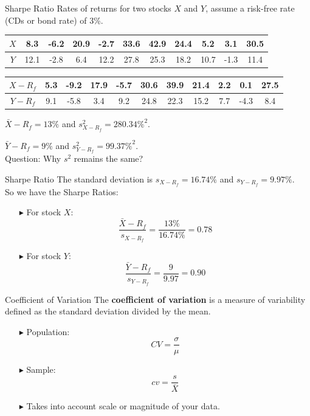 \documentclass[12pt]{beamer}
\begin{document}
\begin{frame}{Sharpe Ratio}
	Rates of returns for two stocks $X$ and $Y$, assume a risk-free rate (CDs or bond rate) of 3\%.
	
	\begin{center}
		\begin{tabular}{|c|c|c|c|c|c|c|c|c|c|c|}
			\hline
			$X$ & 8.3 &-6.2&20.9 &-2.7 &33.6&42.9&24.4&5.2&3.1&30.5\\
			\hline
			$Y$ & 12.1 &-2.8& 6.4& 12.2&27.8&25.3&18.2&10.7&-1.3&11.4\\
			\hline
		\end{tabular}
\end{center}
\begin{center}
		\begin{tabular}{|c|c|c|c|c|c|c|c|c|c|c|}
			\hline
			$X-R_f$ & 5.3 &-9.2&17.9 &-5.7 &30.6&39.9&21.4&2.2&0.1&27.5\\
			\hline
			$Y-R_f$ & 9.1 &-5.8& 3.4& 9.2&24.8&22.3&15.2&7.7&-4.3&8.4\\
			\hline
		\end{tabular}
	\end{center}
	$\bar{X}-R_f=13\%$ and $s_{X-R_f}^2=280.34\%^2$.
	
	$\bar{Y}-R_f=9\%$ and $s_{Y-R_f}^2=99.37\%^2$.\medskip\\
	
	Question: Why $s^2$ remains the same?
\end{frame}
\begin{frame}{Sharpe Ratio}
The standard deviation is
	$s_{X-R_f}=16.74\%$ and $s_{Y-R_f}=9.97\%$.\medskip\\
	
So we have the Sharpe Ratios:
\begin{itemize}
	\item[$\blacktriangleright$] For stock $X$:
	$$\frac{\bar{X}-R_f}{s_{X-R_f}}=\frac{13\%}{16.74\%}=0.78$$
	\item[$\blacktriangleright$] For stock $Y$:
	$$\frac{\bar{Y}-R_f}{s_{Y-R_f}}=\frac{9}{9.97}=0.90$$
\end{itemize}
\end{frame}
\begin{frame}{Coefficient of Variation}
The {\bf coefficient of variation} is a measure of variability defined as the standard deviation divided by the mean.
	\begin{itemize}
		\item[$\blacktriangleright$] Population:
		$$CV=\frac{\sigma}{\mu}$$
		\item[$\blacktriangleright$] Sample:
		$$cv=\frac{s}{\bar{X}}$$
		\item[$\blacktriangleright$] Takes into account scale or magnitude of your data.
	\end{itemize}
\end{frame}
\end{document}
